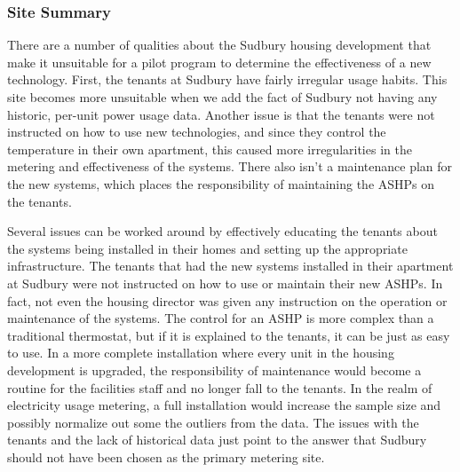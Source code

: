 \subsubsection{Site Summary}
\par There are a number of qualities about the Sudbury housing development that make it unsuitable for a pilot program to determine the effectiveness of a new technology. First, the tenants at Sudbury have fairly irregular usage habits. This site becomes more unsuitable when we add the fact of Sudbury not having any historic, per-unit power usage data. Another issue is that the tenants were not instructed on how to use new technologies, and since they control the temperature in their own apartment, this caused more irregularities in the metering and effectiveness of the systems. There also isn’t a maintenance plan for the new systems, which places the responsibility of maintaining the ASHPs on the tenants.
\par Several issues can be worked around by effectively educating the tenants about the systems being installed in their homes and setting up the appropriate infrastructure. The tenants that had the new systems installed in their apartment at Sudbury were not instructed on how to use or maintain their new ASHPs. In fact, not even the housing director was given any instruction on the operation or maintenance of the systems. The control for an ASHP is more complex than a traditional thermostat, but if it is explained to the tenants, it can be just as easy to use. In a more complete installation where every unit in the housing development is upgraded, the responsibility of maintenance would become a routine for the facilities staff and no longer fall to the tenants. In the realm of electricity usage metering, a full installation would increase the sample size and possibly normalize out some the outliers from the data. The issues with the tenants and the lack of historical data just point to the answer that Sudbury should not have been chosen as the primary metering site.

